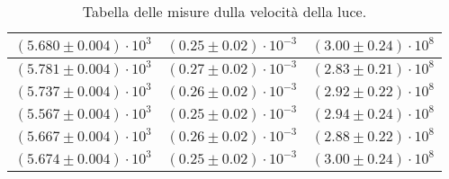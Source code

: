 \begin{table}[H]
\begin{tabular}{|c|c|c|}
        \hline
        $ (5.680 \pm 0.004) \cdot 10^{3} $ & $ (0.25 \pm 0.02) \cdot 10^{-3} $ & $ (3.00 \pm 0.24) \cdot 10^{8} $\\
        \hline
        $ (5.781 \pm 0.004) \cdot 10^{3} $ & $ (0.27 \pm 0.02) \cdot 10^{-3} $ & $ (2.83 \pm 0.21) \cdot 10^{8} $\\
        \hline
        $ (5.737 \pm 0.004) \cdot 10^{3} $ & $ (0.26 \pm 0.02) \cdot 10^{-3} $ & $ (2.92 \pm 0.22) \cdot 10^{8} $\\
        \hline
        $ (5.567 \pm 0.004) \cdot 10^{3} $ & $ (0.25 \pm 0.02) \cdot 10^{-3} $ & $ (2.94 \pm 0.24) \cdot 10^{8} $\\
        \hline
        $ (5.667 \pm 0.004) \cdot 10^{3} $ & $ (0.26 \pm 0.02) \cdot 10^{-3} $ & $ (2.88 \pm 0.22) \cdot 10^{8} $\\
        \hline
        $ (5.674 \pm 0.004) \cdot 10^{3} $ & $ (0.25 \pm 0.02) \cdot 10^{-3} $ & $ (3.00 \pm 0.24) \cdot 10^{8} $\\
        \hline
        \end{tabular}
    \caption{Tabella delle misure dulla velocità della luce.}
\end{table}
